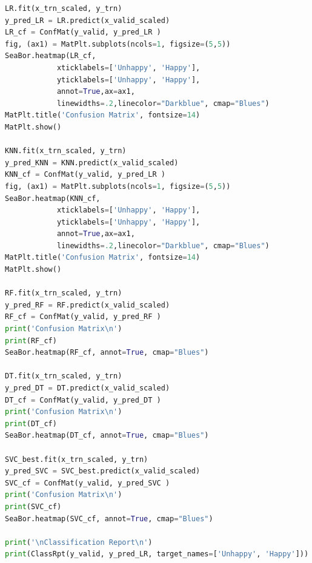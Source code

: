 \documentclass[12pt, a4paper, twoside]{report}
\theoremstyle{plain} %
\theoremstyle{definition} %
\theoremstyle{remark} %
\numberwithin{equation}{chapter}
\begin{document}
\begin{lstlisting}[language=Python, caption=Libraries, breaklines]
LR.fit(x_trn_scaled, y_trn)
y_pred_LR = LR.predict(x_valid_scaled)
LR_cf = ConfMat(y_valid, y_pred_LR )
fig, (ax1) = MatPlt.subplots(ncols=1, figsize=(5,5))
SeaBor.heatmap(LR_cf,
            xticklabels=['Unhappy', 'Happy'],
            yticklabels=['Unhappy', 'Happy'],
            annot=True,ax=ax1,
            linewidths=.2,linecolor="Darkblue", cmap="Blues")
MatPlt.title('Confusion Matrix', fontsize=14)
MatPlt.show()

KNN.fit(x_trn_scaled, y_trn)
y_pred_KNN = KNN.predict(x_valid_scaled)
KNN_cf = ConfMat(y_valid, y_pred_LR )
fig, (ax1) = MatPlt.subplots(ncols=1, figsize=(5,5))
SeaBor.heatmap(KNN_cf,
            xticklabels=['Unhappy', 'Happy'],
            yticklabels=['Unhappy', 'Happy'],
            annot=True,ax=ax1,
            linewidths=.2,linecolor="Darkblue", cmap="Blues")
MatPlt.title('Confusion Matrix', fontsize=14)
MatPlt.show()

RF.fit(x_trn_scaled, y_trn)
y_pred_RF = RF.predict(x_valid_scaled)
RF_cf = ConfMat(y_valid, y_pred_RF )
print('Confusion Matrix\n')
print(RF_cf)
SeaBor.heatmap(RF_cf, annot=True, cmap="Blues")

DT.fit(x_trn_scaled, y_trn)
y_pred_DT = DT.predict(x_valid_scaled)
DT_cf = ConfMat(y_valid, y_pred_DT )
print('Confusion Matrix\n')
print(DT_cf)
SeaBor.heatmap(DT_cf, annot=True, cmap="Blues")

SVC_best.fit(x_trn_scaled, y_trn)
y_pred_SVC = SVC_best.predict(x_valid_scaled)
SVC_cf = ConfMat(y_valid, y_pred_SVC )
print('Confusion Matrix\n')
print(SVC_cf)
SeaBor.heatmap(SVC_cf, annot=True, cmap="Blues")

print('\nClassification Report\n')
print(ClassRpt(y_valid, y_pred_LR, target_names=['Unhappy', 'Happy']))
\end{lstlisting}
\end{document}
